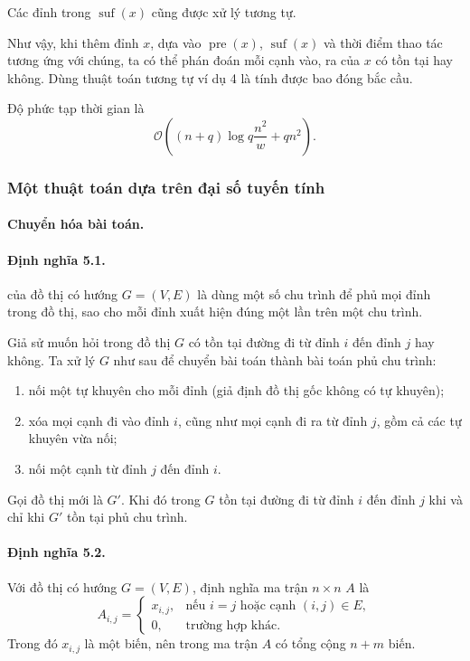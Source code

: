 \documentclass[11pt]{article}
\newcommand{\Oh}{\mathcal{O}}
\begin{document}
Các đỉnh trong \(\operatorname{suf}(x)\) cũng được xử lý tương tự.

Như vậy, khi thêm đỉnh \(x\), dựa vào \(\operatorname{pre}(x)\),
\(\operatorname{suf}(x)\) và thời điểm thao tác tương ứng với chúng, ta có thể
phán đoán mỗi cạnh vào, ra của \(x\) có tồn tại hay không. Dùng thuật toán
tương tự ví dụ 4 là tính được bao đóng bắc cầu.

Độ phức tạp thời gian là
\[
  \Oh\left((n+q)\log q\frac{n^2}{w}+qn^2\right).
\]

\subsubsection{Một thuật toán dựa trên đại số tuyến tính}

\paragraph{Chuyển hóa bài toán.}
\paragraph{Định nghĩa 5.1.}
 của đồ thị có hướng \(G=(V,E)\) là dùng một số chu trình
để phủ mọi đỉnh trong đồ thị, sao cho mỗi đỉnh xuất hiện đúng một lần trên
một chu trình.

Giả sử muốn hỏi trong đồ thị \(G\) có tồn tại đường đi từ đỉnh \(i\) đến đỉnh
\(j\) hay không. Ta xử lý \(G\) như sau để chuyển bài toán thành bài toán phủ
chu trình:
\begin{enumerate}
  \item nối một tự khuyên cho mỗi đỉnh (giả định đồ thị gốc không có tự
  khuyên);

  \item xóa mọi cạnh đi vào đỉnh \(i\), cũng như mọi cạnh đi ra từ đỉnh \(j\),
  gồm cả các tự khuyên vừa nối;

  \item nối một cạnh từ đỉnh \(j\) đến đỉnh \(i\).
\end{enumerate}

Gọi đồ thị mới là \(G'\). Khi đó trong \(G\) tồn tại đường đi từ đỉnh \(i\)
đến đỉnh \(j\) khi và chỉ khi \(G'\) tồn tại phủ chu trình.

\paragraph{Định nghĩa 5.2.}
Với đồ thị có hướng \(G=(V,E)\), định nghĩa ma trận \(n\times n\) \(A\) là
\[
  A_{i,j} =
  \begin{cases}
    x_{i,j}, & \text{nếu } i=j \text{ hoặc cạnh } (i,j)\in E,\\
    0, & \text{trường hợp khác}.
  \end{cases}
\]
Trong đó \(x_{i,j}\) là một biến, nên trong ma trận \(A\) có tổng cộng
\(n+m\) biến.
\end{document}
